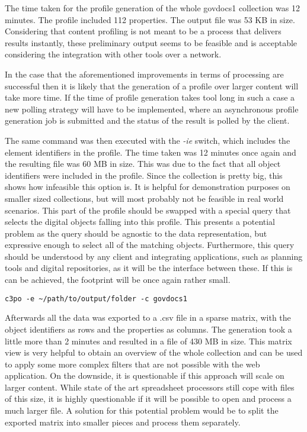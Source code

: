 The time taken for the profile generation of the whole govdocs1 collection was 12 minutes.
The profile included 112 properties. The output file was 53 KB in size.
Considering that content profiling is not meant to be a process that delivers results instantly, these preliminary output seems to be feasible and is acceptable considering the integration with other tools over a network.

In the case that the aforementioned improvements in terms of processing are successful then it is likely that the generation of a profile over larger content will take more time.
If the time of profile generation takes tool long in such a case a new polling strategy will have to be implemented, where an asynchronous profile generation job is submitted and the status of the result is polled by the client.

The same command was then executed with the \textit{-ie} switch, which includes the element identifiers in the profile.
The time taken was 12 minutes once again and the resulting file was 60 MB in size.
This was due to the fact that all object identifiers were included in the profile.
Since the collection is pretty big, this shows how infeasible this option is.
It is helpful for demonstration purposes on smaller sized collections, but will most probably not be feasible in real world scenarios.
This part of the profile should be swapped with a special query that selects the digital objects falling into this profile.
This presents a potential problem as the query should be agnostic to the data representation, but expressive enough to select all of the matching objects.
Furthermore, this query should be understood by any client and integrating applications, such as planning tools and digital repositories, as it will be the interface between these.
If this is can be achieved, the footprint will be once again rather small. 


\begin{verbatim}
c3po -e ~/path/to/output/folder -c govdocs1
\end{verbatim}
Afterwards all the data was exported to a .csv file in a sparse matrix, with the object identifiers as rows and the properties as columns.
The generation took a little more than 2 minutes and resulted in a file of 430 MB in size.
This matrix view is very helpful to obtain an overview of the whole collection and can be used to apply some more complex filters that are not possible with the web application.
On the downside, it is questionable if this approach will scale on larger content.
While state of the art spreadsheet processors still cope with files of this size, it is highly questionable if it will be possible to open and process a much larger file.
A solution for this potential problem would be to split the exported matrix into smaller pieces and process them separately.

